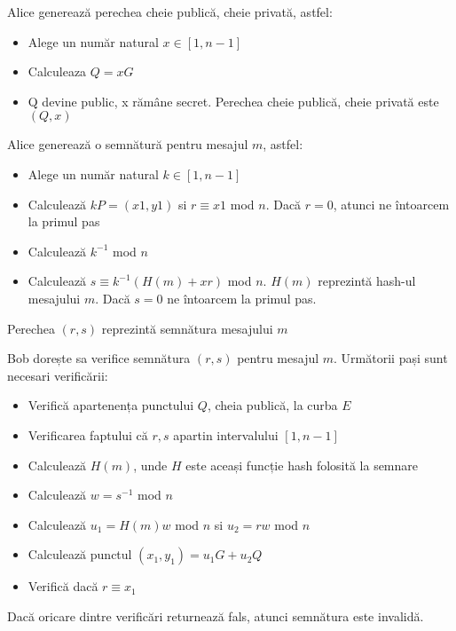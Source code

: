 \begin{dfn}

Alice generează perechea cheie publică, cheie privată, astfel:
\begin{itemize}
\item Alege un număr natural $x\in [1, n-1]$
\item Calculeaza $Q = xG$
\item Q devine public, x rămâne secret. Perechea cheie publică, cheie privată este $(Q, x)$
\end{itemize}

\end{dfn}

\begin{dfn}

Alice generează o semnătură pentru mesajul $m$, astfel:
\begin{itemize}
\item Alege un număr natural $k\in [1, n-1]$
\item Calculează $kP = (x1, y1)$ si $r \equiv x1$ mod $n$. Dacă $r=0$, atunci ne întoarcem la primul pas
\item Calculează $k^{-1}$ mod $n$
\item Calculează $s \equiv k^{-1}(H(m) + xr)$ mod $n$. $H(m)$ reprezintă hash-ul mesajului $m$. Dacă $s = 0$ ne întoarcem la primul pas.
\end{itemize}
Perechea $(r, s)$ reprezintă semnătura mesajului $m$

\end{dfn}
\begin{dfn}

Bob dorește sa verifice semnătura $(r, s)$ pentru mesajul $m$. Următorii pași sunt necesari verificării:
\begin{itemize}
\item Verifică apartenența punctului $Q$, cheia publică, la curba $E$
\item Verificarea faptului că $r, s$ apartin intervalului $[1, n-1]$
\item Calculează $H(m)$, unde $H$ este aceași funcție hash folosită la semnare
\item Calculează $w = s^{-1}$ mod $n$
\item Calculează $u_1 = H(m)w$ mod $n$ si $u_2 = rw$ mod $n$
\item Calculează punctul $(x_1, y_1) = u_1G + u_2Q$
\item Verifică dacă $r\equiv x_1$
\end{itemize}
Dacă oricare dintre verificări returnează fals, atunci semnătura este invalidă.

\end{dfn}


